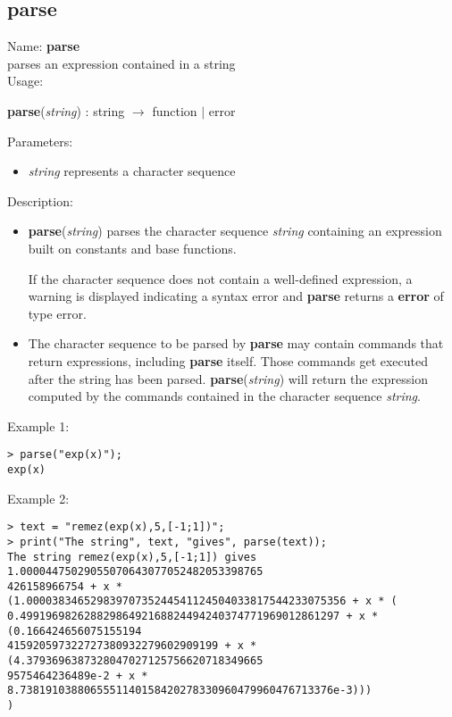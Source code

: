 \subsection{parse}
\label{labparse}
\noindent Name: \textbf{parse}\\
parses an expression contained in a string\\
\noindent Usage: 
\begin{center}
\textbf{parse}(\emph{string}) : \textsf{string} $\rightarrow$ \textsf{function} $|$ \textsf{error}\\
\end{center}
Parameters: 
\begin{itemize}
\item \emph{string} represents a character sequence
\end{itemize}
\noindent Description: \begin{itemize}

\item \textbf{parse}(\emph{string}) parses the character sequence \emph{string} containing
   an expression built on constants and base functions.
    
   If the character sequence does not contain a well-defined expression,
   a warning is displayed indicating a syntax error and \textbf{parse} returns
   a \textbf{error} of type \textsf{error}.

\item The character sequence to be parsed by \textbf{parse} may contain commands that 
   return expressions, including \textbf{parse} itself. Those commands get executed after the string has been parsed.
   \textbf{parse}(\emph{string}) will return the expression computed by the commands contained in the character 
   sequence \emph{string}.
\end{itemize}
\noindent Example 1: 
\begin{center}\begin{minipage}{15cm}\begin{Verbatim}[frame=single]
> parse("exp(x)");
exp(x)
\end{Verbatim}
\end{minipage}\end{center}
\noindent Example 2: 
\begin{center}\begin{minipage}{15cm}\begin{Verbatim}[frame=single]
> text = "remez(exp(x),5,[-1;1])";
> print("The string", text, "gives", parse(text));
The string remez(exp(x),5,[-1;1]) gives 1.00004475029055070643077052482053398765
426158966754 + x * (1.00003834652983970735244541124504033817544233075356 + x * (
0.49919698262882986492168824494240374771969012861297 + x * (0.166424656075155194
415920597322727380932279602909199 + x * (4.3793696387328047027125756620718349665
9575464236489e-2 + x * 8.7381910388065551140158420278330960479960476713376e-3)))
)
\end{Verbatim}
\end{minipage}\end{center}
